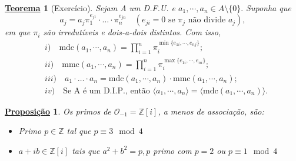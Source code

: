 \documentclass{article}
\newtheorem*{theorem*}{\underline{Teorema}}
\newtheorem*{prop*}{\underline{Proposi\c c\~ao}}
\begin{document}
    \begin{theorem*}[Exercício]
      Sejam A um D.F.U. e \(a_{1}, \cdots, a_{n}\in A\setminus{\{0\}}.\) Suponha que 
      \[
        a_{j} = a_{j}\pi_{1}^{e_{j1}}\cdot\dotsc \cdot \pi_{n}^{e_{jn}} \quad (e_{ji} = 0 \text{ se } \pi_{j} \text{ não divide } a_{j}),
      \]
      em que \(\pi_{i}\) são irredutíveis e dois-a-dois distintos. Com isso, 
      \begin{align*}
    &i)\quad\mathrm{mdc}(a_{1},\cdots,a_{n}) = \prod\limits_{i=1}^{n}\pi_{i}^{\min\{e_{1i}, \cdots, e_{nj}\}};\\
    &ii)\quad \mathrm{mmc}(a_{1}, \cdots, a_{n}) = \prod\limits_{i=1}^{n}\pi_{i}^{\max\{e_{1i}, \cdots, e_{ni}\}};\\
    &iii)\quad a_{1}\cdot \dotsc \cdot  a_{n} = \mathrm{mdc}(a_{1}, \cdots, a_{n})\cdot \mathrm{mmc}(a_{1}, \cdots, a_{n});\\
    &iv)\quad \text{Se A é um D.I.P., então }  \langle a_{1}, \cdots, a_{n} \rangle = \langle \mathrm{mdc}(a_{1}, \cdots, a_{n}) \rangle.
      \end{align*}
    \end{theorem*}
    \begin{prop*}
      Os primos de \(\mathcal{O}_{-1} = \mathbb{Z}[i]\), a menos de associação, são:
      \begin{itemize}
        \item[1)] Primo \(p\in \mathbb{Z}\) tal que \(p\equiv 3 \mod 4\)
        \item[2)] \(a+ib\in \mathbb{Z}[i]\) tais que \(a^{2} + b^{2} = p, p\) primo com \(p = 2\) ou \(p\equiv 1 \mod 4\)
      \end{itemize}
    \end{prop*}
\end{document}
